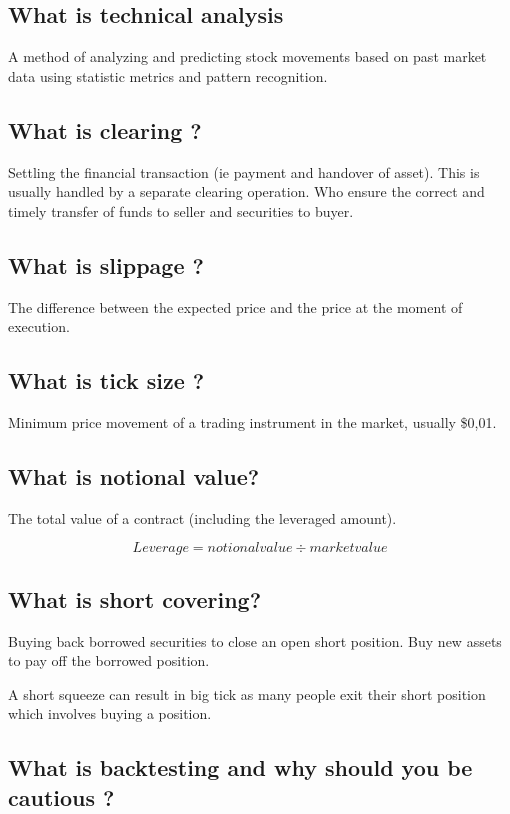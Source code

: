 \documentclass[11pt]{scrartcl} %
\begin{document}
\subsection{What is technical analysis}

A method of analyzing and predicting stock movements based on past market data using statistic metrics
and pattern recognition.

\subsection{What is clearing ?}

Settling the financial transaction (ie payment and handover of asset). This is usually handled by a 
separate clearing operation. Who ensure the correct and timely transfer of funds to seller and
securities to buyer.

\subsection{What is slippage ?}

The difference between the expected price and the price at the moment of execution. 

\subsection{What is tick size ?}

Minimum price movement of a trading instrument in the market, usually \$0,01.

\subsection{What is notional value?}

The total value of a contract (including the leveraged amount).

\[ Leverage = notional value \div market value\]

\subsection{What is short covering?}

Buying back borrowed securities to close an open short position. Buy new assets to pay off the borrowed
position. 

A short squeeze can result in big tick as many people exit their short position which involves buying
a position. 

\subsection{What is backtesting and why should you be cautious ?}
\end{document}
